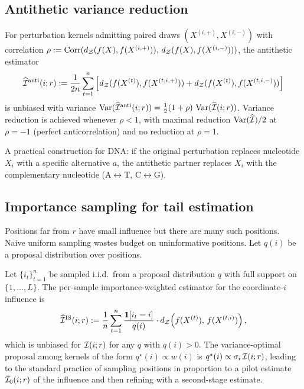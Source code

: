 \subsection{Antithetic variance reduction}

\begin{proposition}\label{prop:antithetic}
For perturbation kernels admitting paired draws $(X^{(i,+)}, X^{(i,-)})$ with correlation $\rho := \mathrm{Corr}(d_{\mathcal{Z}}(f(X),f(X^{(i,+)})),\, d_{\mathcal{Z}}(f(X),f(X^{(i,-)})))$, the antithetic estimator
\[
\widehat{\mathcal{I}}^{\mathrm{anti}}(i;r) := \frac{1}{2n}\sum_{t=1}^n \left[d_{\mathcal{Z}}(f(X^{(t)}),f(X^{(t,i,+)})) + d_{\mathcal{Z}}(f(X^{(t)}),f(X^{(t,i,-)}))\right]
\]
is unbiased with variance $\operatorname{Var}(\widehat{\mathcal{I}}^{\mathrm{anti}}(i;r)) = \tfrac{1}{2}(1+\rho)\,\operatorname{Var}(\widehat{\mathcal{I}}(i;r))$. Variance reduction is achieved whenever $\rho < 1$, with maximal reduction $\operatorname{Var}(\widehat{\mathcal{I}})/2$ at $\rho = -1$ (perfect anticorrelation) and no reduction at $\rho = 1$.
\end{proposition}

A practical construction for DNA: if the original perturbation replaces nucleotide $X_i$ with a specific alternative $a$, the antithetic partner replaces $X_i$ with the complementary nucleotide (A$\leftrightarrow$T, C$\leftrightarrow$G).

\subsection{Importance sampling for tail estimation}

Positions far from $r$ have small influence but there are many such positions. Naive uniform sampling wastes budget on uninformative positions. Let $q(i)$ be a proposal distribution over positions.

\begin{proposition}\label{prop:importance}
Let $\{i_t\}_{t=1}^n$ be sampled i.i.d.\ from a proposal distribution $q$ with full support on $\{1,\dots,L\}$. The per-sample importance-weighted estimator for the coordinate-$i$ influence is
\[
\widehat{\mathcal{I}}^{\mathrm{IS}}(i;r) := \frac{1}{n} \sum_{t=1}^n \frac{\mathbf{1}[i_t = i]}{q(i)} \cdot d_{\mathcal{Z}}\!\left(f(X^{(t)}),\, f(X^{(t,i)})\right),
\]
which is unbiased for $\mathcal{I}(i;r)$ for any $q$ with $q(i) > 0$. The variance-optimal proposal among kernels of the form $q^\star(i) \propto w(i)$ is $q^\star(i) \propto \sigma_i\, \mathcal{I}(i;r)$, leading to the standard practice of sampling positions in proportion to a pilot estimate $\bar{\mathcal{I}}_0(i;r)$ of the influence and then refining with a second-stage estimate.
\end{proposition}

